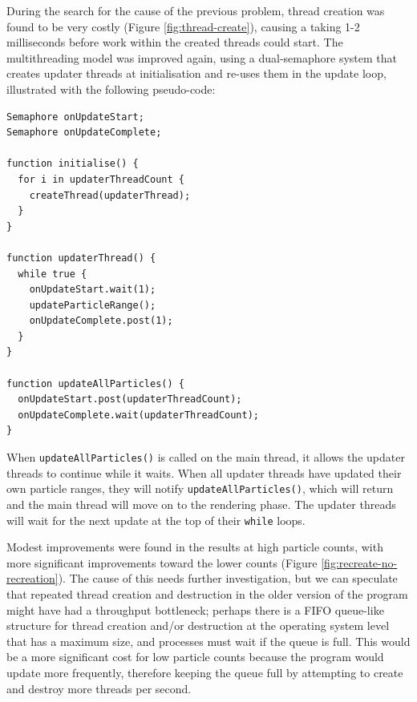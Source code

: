 \documentclass[11pt, a4paper, twocolumn]{article}
\begin{document}
During the search for the cause of the previous problem, thread creation was found to be very costly (Figure \ref{fig:thread-create}), causing a taking 1-2 milliseconds before work within the created threads could start. The multithreading model was improved again, using a dual-semaphore system that creates updater threads at initialisation and re-uses them in the update loop, illustrated with the following pseudo-code:

\begin{verbatim}
Semaphore onUpdateStart;
Semaphore onUpdateComplete;

function initialise() {
  for i in updaterThreadCount {
    createThread(updaterThread);
  }
}

function updaterThread() {
  while true {
    onUpdateStart.wait(1);
    updateParticleRange();
    onUpdateComplete.post(1);
  }
}

function updateAllParticles() {
  onUpdateStart.post(updaterThreadCount);
  onUpdateComplete.wait(updaterThreadCount);
}
\end{verbatim}

When \verb|updateAllParticles()| is called on the main thread, it allows the updater threads to continue while it waits. When all updater threads have updated their own particle ranges, they will notify \verb|updateAllParticles()|, which will return and the main thread will move on to the rendering phase. The updater threads will wait for the next update at the top of their \verb|while| loops.

Modest improvements were found in the results at high particle counts, with more significant improvements toward the lower counts (Figure \ref{fig:recreate-no-recreation}). The cause of this needs further investigation, but we can speculate that repeated thread creation and destruction in the older version of the program might have had a throughput bottleneck; perhaps there is a FIFO queue-like structure for thread creation and/or destruction at the operating system level that has a maximum size, and processes must wait if the queue is full. This would be a more significant cost for low particle counts because the program would update more frequently, therefore keeping the queue full by attempting to create and destroy more threads per second.
\end{document}
